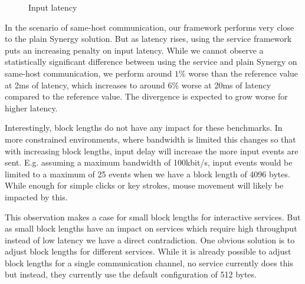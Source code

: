 \begin{figure}[t]
    \centering
    \caption{Input latency}
    \label{fig:input-latency}
\end{figure}


In the scenario of same-host communication, our framework performs very close to the plain Synergy solution.
But as latency rises, using the service framework puts an increasing penalty on input latency.
While we cannot observe a statistically significant difference between using the service and plain Synergy on same-host communication, we perform around $1\%$ worse than the reference value at 2ms of latency, which increases to around $6\%$ worse at 20ms of latency compared to the reference value.
The divergence is expected to grow worse for higher latency.

Interestingly, block lengths do not have any impact for these benchmarks.
In more constrained environments, where bandwidth is limited this changes so that with increasing block lengths, input delay will increase the more input events are sent.
E.g. assuming a maximum bandwidth of 100kbit/s, input events would be limited to a maximum of 25 events when we have a block length of 4096 bytes.
While enough for simple clicks or key strokes, mouse movement will likely be impacted by this.

This observation makes a case for small block lengths for interactive services.
But as small block lengths have an impact on services which require high throughput instead of low latency we have a direct contradiction.
One obvious solution is to adjust block lengths for different services.
While it is already possible to adjust block lengths for a single communication channel, no service currently does this but instead, they currently use the default configuration of 512 bytes.

